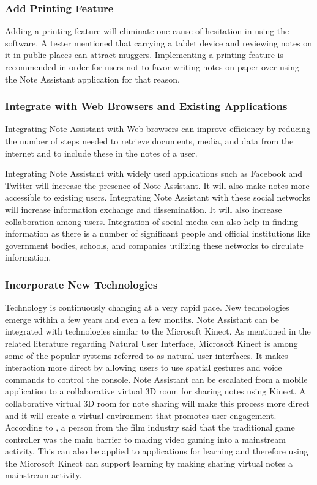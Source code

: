 \subsubsection{Add Printing Feature}
\label{sec:addprintingfeature}

Adding a printing feature will eliminate one cause of hesitation in using the software. A tester mentioned that carrying a tablet device and reviewing notes on it in public places can attract muggers.  Implementing a printing feature is recommended in order for users not to favor writing notes on paper over using the Note Assistant application for that reason.

\subsubsection{Integrate with Web Browsers and Existing Applications}
\label{sec:integratexistingapplications}

Integrating Note Assistant with Web browsers can improve efficiency by reducing the number of steps needed to retrieve documents, media, and data from the internet and to include these in the notes of a user.
 
Integrating Note Assistant with widely used applications such as Facebook and Twitter will increase the presence of Note Assistant. It will also make notes more accessible to existing users. Integrating Note Assistant with these social networks will increase information exchange and dissemination. It will also increase collaboration among users. Integration of social media can also help in finding information as there is a number of significant people and official institutions like government bodies, schools, and companies utilizing these networks to circulate information.


\subsubsection{Incorporate New Technologies}
\label{sec:incorporatenewtechnologies}

Technology is continuously changing at a very rapid pace. New technologies emerge within a few years and even a few months. Note Assistant can be integrated with technologies similar to the Microsoft Kinect. As mentioned in the related literature regarding Natural User Interface, Microsoft Kinect is among some of the popular systems referred to as natural user interfaces. It makes interaction more direct by allowing users to use spatial gestures and voice commands to control the console. Note Assistant can be escalated from a mobile application to a collaborative virtual 3D room for sharing notes using Kinect. A collaborative virtual 3D room for note sharing will make this process more direct and it will create a virtual environment that promotes user engagement. According to \cite{rosoff:2011}, a person from the film industry said that the traditional game controller was the main barrier to making video gaming into a mainstream activity. This can also be applied to applications for learning and therefore using the Microsoft Kinect can support learning by making sharing virtual notes a mainstream activity.  